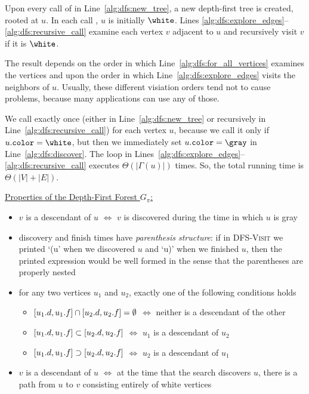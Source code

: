Upon every call of  in Line~\ref{alg:dfs:new_tree}, a new depth-first tree is created, rooted at \(u\).
In each call , \(u\) is initially \(\white\).
Lines \ref{alg:dfs:explore_edges}--\ref{alg:dfs:recursive_call} examine each vertex \(v\) adjacent to \(u\) and recursively visit \(v\) if it is \(\white\).

The result depends on the order in which Line~\ref{alg:dfs:for_all_vertices} examines the vertices and upon the order in which Line~\ref{alg:dfs:explore_edges} visits the neighbors of \(u\).
Usually, these different visiation orders tend not to cause problems, because many applications can use any of those.

We call  exactly once (either in Line~\ref{alg:dfs:new_tree} or recursively in Line~\ref{alg:dfs:recursive_call}) for each vertex \(u\), because we call it only if \(\attrib{u}{color}=\white\), but then we immediately set \(\attrib{u}{color}=\gray\) in Line~\ref{alg:dfs:discover}.
The loop in Lines~\ref{alg:dfs:explore_edges}--\ref{alg:dfs:recursive_call} executes \(\Theta(|\Gamma(u)|)\) times.
So, the total running time is $\Theta(|V|+|E|)$.

\underline{Properties of the Depth-First Forest \(G_\pi\):}
\begin{itemize}
  \item \(v\) is a descendant of \(u\) \(\Longleftrightarrow\) \(v\) is discovered during the time in which \(u\) is gray
  \item discovery and finish times have \emph{parenthesis structure}: if in \textsc{DFS-Visit} we printed `(u' when we discovered \(u\) and `u)' when we finished \(u\), then the printed expression would be well formed in the sense that the parentheses are properly nested
  \item for any two vertices \(u_1\) and \(u_2\), exactly one of the following conditions holds
    \begin{itemize}
      \item \([u_1\mathtt{.}d, u_1\mathtt{.}f] \cap [u_2\mathtt{.}d, u_2\mathtt{.}f] = \emptyset\) \(\Longleftrightarrow\) neither is a descendant of the other
      \item \([u_1\mathtt{.}d, u_1\mathtt{.}f] \subset [u_2\mathtt{.}d, u_2\mathtt{.}f]\) \(\Longleftrightarrow\) \(u_1\) is a descendant of \(u_2\)
      \item \([u_1\mathtt{.}d, u_1\mathtt{.}f] \supset [u_2\mathtt{.}d, u_2\mathtt{.}f]\) \(\Longleftrightarrow\) \(u_2\) is a descendant of \(u_1\)
    \end{itemize}
  \item \(v\) is a descendant of \(u\) \(\Longleftrightarrow\) at the time  that the search discovers \(u\), there is a path from \(u\) to \(v\) consisting entirely of white vertices
\end{itemize}

